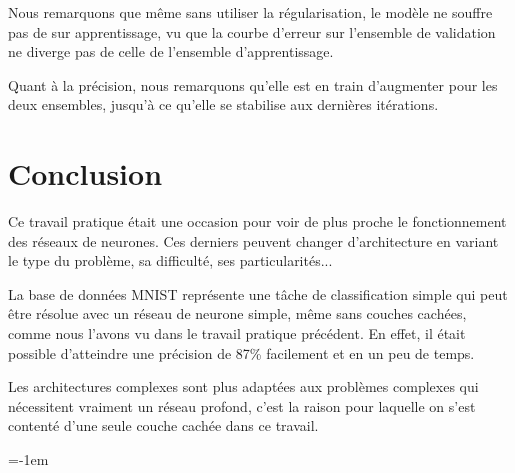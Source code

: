 \documentclass[a4paper,english,12pt]{article}
\makeatletter
\newcommand{\emptypage}[1]{
  \cleardoublepage
  \begingroup
  \let\ps@plain\ps@empty
  \pagestyle{empty}
  #1
  \cleardoublepage
  \endgroup}
\makeatother
\begin{document}
Nous remarquons que même sans utiliser la régularisation, le modèle ne souffre pas de sur apprentissage, vu que la courbe d'erreur sur l'ensemble de validation ne diverge pas de celle de l'ensemble d'apprentissage.

Quant à la précision, nous remarquons qu'elle est en train d'augmenter pour les deux ensembles, jusqu'à ce qu'elle se stabilise aux dernières itérations.


\section{Conclusion}
Ce travail pratique était une occasion pour voir de plus proche le fonctionnement des réseaux de neurones. Ces derniers peuvent changer d'architecture en variant le type du problème, sa difficulté, ses particularités... 

La base de données MNIST représente une tâche de classification simple qui peut être résolue avec un réseau de neurone simple, même sans couches cachées, comme nous l'avons vu dans le travail pratique précédent. En effet, il était possible d'atteindre une précision de 87\% facilement et en un peu de temps.

Les architectures complexes sont plus adaptées aux problèmes complexes qui nécessitent vraiment un réseau profond, c'est la raison pour laquelle on s'est contenté d'une seule couche cachée dans ce travail.

\parskip=-1em
\let\section\oldsection %
%
\end{document}
